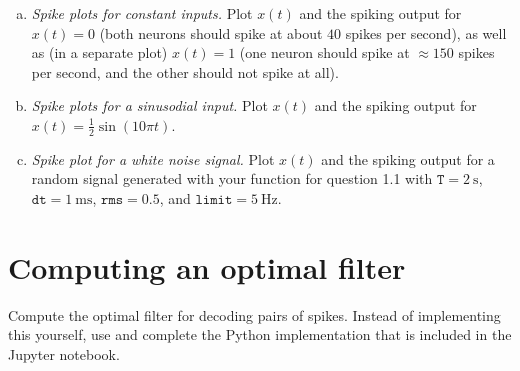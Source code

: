 	\begin{enumerate}[a)]
		\item {} \textit{Spike plots for constant inputs.} Plot $x(t)$ and the spiking output for $x(t)=0$ (both neurons should spike at about $40$ spikes per second), as well as (in a separate plot) $x(t)=1$ (one neuron should spike at $\approx 150$ spikes per second, and the other should not spike at all).
		\item {} \textit{Spike plots for a sinusodial input.} Plot $x(t)$ and the spiking output for $x(t)=\frac{1}2 \sin(10 \pi t)$.
		\item {} \textit{Spike plot for a white noise signal.} Plot $x(t)$ and the spiking output for a random signal generated with your function for question 1.1 with $\mathtt{T}=\SI{2}{\second}$, $\mathtt{dt}=\SI{1}{\milli\second}$, $\mathtt{rms}=0.5$, and $\mathtt{limit}=\SI{5}{\hertz}$.
	\end{enumerate}

	\section{Computing an optimal filter}

	Compute the optimal filter for decoding pairs of spikes. Instead of implementing this yourself, use and complete the Python implementation that is included in the Jupyter notebook.

